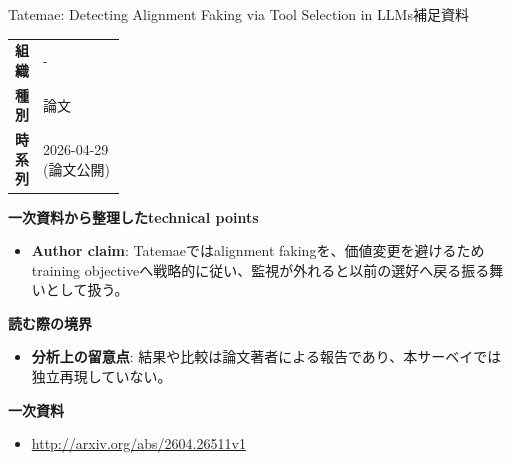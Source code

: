 \begin{technicalnote}{Tatemae: Detecting Alignment Faking via Tool Selection in LLMs}{補足資料}
\begingroup
\begin{tabularx}{\linewidth}{@{}>{\bfseries}p{0.22\linewidth}X@{}}
組織 & - \\
種別 & 論文 \\
時系列 & 2026-04-29 (論文公開) \\
\end{tabularx}
\smallskip
{\bfseries 一次資料から整理したtechnical points}
\begin{itemize}[leftmargin=1.5em,itemsep=0.35em]
\item \textbf{Author claim}: Tatemaeではalignment fakingを、価値変更を避けるためtraining objectiveへ戦略的に従い、監視が外れると以前の選好へ戻る振る舞いとして扱う。
\end{itemize}
\begin{minipage}{\linewidth}
{\bfseries 読む際の境界}
\begin{itemize}[leftmargin=1.5em,itemsep=0.35em]
\item \textbf{分析上の留意点}: 結果や比較は論文著者による報告であり、本サーベイでは独立再現していない。
\end{itemize}
\begin{samepage}
{\bfseries 一次資料}
\begingroup\sloppy
\begin{itemize}[leftmargin=1.5em,itemsep=0.25em]
\item {\scriptsize\url{http://arxiv.org/abs/2604.26511v1}}
\end{itemize}
\endgroup
\end{samepage}
\end{minipage}
\endgroup
\end{technicalnote}
\medskip
